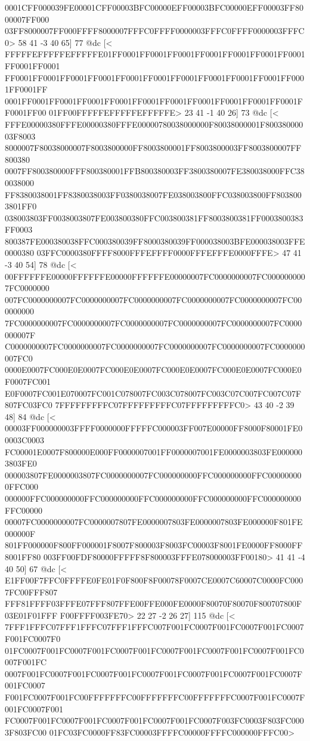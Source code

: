 0001CFF000039FE00001CFF00003BFC00000EFF00003BFC00000EFF00003FF8000007FF000
03FF8000007FF000FFFF8000007FFFC0FFFF0000003FFFC0FFFF0000003FFFC0>
	 58 41 -3 40 65] 77 @dc
[<
FFFFFEFFFFFEFFFFFE01FF0001FF0001FF0001FF0001FF0001FF0001FF0001FF0001FF0001
FF0001FF0001FF0001FF0001FF0001FF0001FF0001FF0001FF0001FF0001FF0001FF0001FF
0001FF0001FF0001FF0001FF0001FF0001FF0001FF0001FF0001FF0001FF0001FF0001FF00
01FF00FFFFFEFFFFFEFFFFFE>
	 23 41 -1 40 26] 73 @dc
[<
FFFE00000380FFFE00000380FFFE00000780038000000F80038000001F80038000003F8003
8000007F80038000007F8003800000FF8003800001FF8003800003FF8003800007FF800380
0007FF800380000FFF800380001FFB800380003FF3800380007FE380038000FFC380038000
FF8380038001FF8380038003FF0380038007FE038003800FFC038003800FF8038003801FF0
038003803FF0038003807FE003800380FFC003800381FF8003800381FF0003800383FF0003
800387FE000380038FFC000380039FF8000380039FF000038003BFE000038003FFE0000380
03FFC0000380FFFF8000FFFEFFFF0000FFFEFFFE0000FFFE>
	 47 41 -3 40 54] 78 @dc
[<
00FFFFFFE00000FFFFFFE00000FFFFFFE00000007FC0000000007FC0000000007FC0000000
007FC0000000007FC0000000007FC0000000007FC0000000007FC0000000007FC000000000
7FC0000000007FC0000000007FC0000000007FC0000000007FC0000000007FC0000000007F
C0000000007FC0000000007FC0000000007FC0000000007FC0000000007FC0000000007FC0
0000E0007FC000E0E0007FC000E0E0007FC000E0E0007FC000E0E0007FC000E0F0007FC001
E0F0007FC001E070007FC001C078007FC003C078007FC003C07C007FC007C07F807FC03FC0
7FFFFFFFFFC07FFFFFFFFFC07FFFFFFFFFC0>
	 43 40 -2 39 48] 84 @dc
[<
00003FF000000003FFFF0000000FFFFFC000003FF007E00000FF8000F80001FE00003C0003
FC00001E0007F800000E000FF0000007001FF0000007001FE0000003803FE0000003803FE0
000003807FE0000003807FC0000000007FC000000000FFC000000000FFC000000000FFC000
000000FFC000000000FFC000000000FFC000000000FFC000000000FFC000000000FFC00000
00007FC0000000007FC0000007807FE0000007803FE0000007803FE000000F801FE000000F
801FF000000F800FF000001F8007F800003F8003FC00003F8001FE0000FF8000FF8001FF80
003FF00FDF80000FFFFF8F800003FFFE078000003FF00180>
	 41 41 -4 40 50] 67 @dc
[<
E1FF00F7FFC0FFFFE0FE01F0F800F8F00078F0007CE0007C60007C0000FC0007FC00FFF807
FFF81FFFF03FFFE07FFF807FFE00FFE000FE0000F80070F80070F800707800F03E01F01FFF
F00FFFF003FE70>
	 22 27 -2 26 27] 115 @dc
[<
7FFF1FFFC07FFF1FFFC07FFF1FFFC007F001FC0007F001FC0007F001FC0007F001FC0007F0
01FC0007F001FC0007F001FC0007F001FC0007F001FC0007F001FC0007F001FC0007F001FC
0007F001FC0007F001FC0007F001FC0007F001FC0007F001FC0007F001FC0007F001FC0007
F001FC0007F001FC00FFFFFFFC00FFFFFFFC00FFFFFFFC0007F001FC0007F001FC0007F001
FC0007F001FC0007F001FC0007F001FC0007F001FC0007F003FC0003F803FC0003F803FC00
01FC03FC0000FF83FC00003FFFFC00000FFFFC000000FFFC00>
